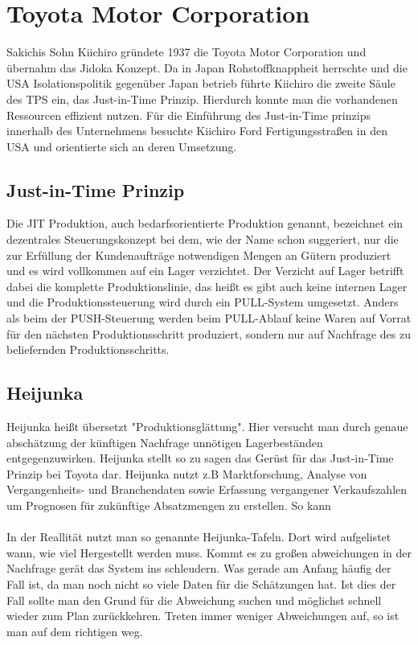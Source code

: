\documentclass[00_ToyotaProduktionssystem.tex]{subfiles}
\begin{document}
\section{Toyota Motor Corporation}
Sakichis Sohn Kiichiro gründete 1937 die Toyota Motor Corporation und übernahm das Jidoka Konzept. Da in Japan Rohstoffknappheit herrschte und die USA Isolationspolitik gegenüber Japan betrieb führte Kiichiro die zweite Säule des TPS ein, das Just-in-Time Prinzip. Hierdurch konnte man die vorhandenen Ressourcen effizient nutzen. Für die Einführung des Just-in-Time prinzips innerhalb des Unternehmens besuchte Kiichiro Ford Fertigungsstraßen in den USA und orientierte sich an deren Umsetzung.
\subsection{Just-in-Time Prinzip}
Die JIT Produktion, auch bedarfsorientierte Produktion genannt, bezeichnet ein dezentrales Steuerungskonzept bei dem,  wie der Name schon suggeriert, nur die zur Erfüllung der Kundenaufträge notwendigen Mengen an Gütern produziert und es wird vollkommen auf ein Lager verzichtet. Der Verzicht auf Lager betrifft dabei die komplette Produktionslinie, das heißt es gibt auch keine internen Lager und die Produktionssteuerung wird durch ein PULL-System umgesetzt. Anders als beim der PUSH-Steuerung werden beim PULL-Ablauf keine Waren auf Vorrat für den nächsten Produktionsschritt produziert, sondern nur auf Nachfrage des zu beliefernden Produktionsschritts.

\subsection{Heijunka}
Heijunka heißt übersetzt "Produktionsglättung". Hier versucht man durch genaue abschätzung der künftigen Nachfrage unnötigen Lagerbeständen entgegenzuwirken. Heijunka stellt so zu sagen das Gerüst für das Just-in-Time Prinzip bei Toyota dar. Heijunka nutzt z.B Marktforschung, Analyse von Vergangenheits- und Branchendaten sowie Erfassung vergangener Verkaufszahlen um Prognosen für zukünftige Absatzmengen zu erstellen. So kann 
\\
\\
In der Reallität nutzt man so genannte Heijunka-Tafeln. Dort wird aufgelistet wann, wie viel Hergestellt werden muss. Kommt es zu großen abweichungen in der Nachfrage gerät das System ins schleudern. Was gerade am Anfang häufig der Fall ist, da man noch nicht so viele Daten für die Schätzungen hat. 
Ist dies der Fall sollte man den Grund für die Abweichung suchen und möglichst schnell wieder zum Plan zurückkehren. Treten immer weniger Abweichungen auf, so ist man auf dem richtigen weg.
\end{document}
